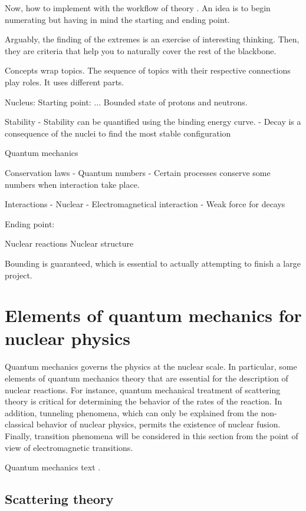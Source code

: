 \documentclass[openany]{book}
\begin{document}
	Now, how to implement with the workflow of theory 
	. An idea is to begin numerating but having in mind the starting and ending point. 
	
	Arguably, the finding of the extremes is an exercise of interesting thinking. Then, they are criteria that help you to naturally cover the rest of the blackbone. 
 
 
 Concepts wrap topics. The sequence of topics with their respective connections play roles. It uses different parts. 
 
 Nucleus:
 Starting point: ...
 	Bounded state of protons and neutrons. 
 	
 	Stability 
 		-	Stability can be quantified using the binding energy curve. 
 		-	Decay is a consequence of the nuclei to find the most stable configuration
 	
 	Quantum mechanics 
 	
  	Conservation laws
 		-	Quantum numbers
 		-	Certain processes conserve some numbers when interaction take place. 
 	
 	Interactions
 		-	Nuclear 
 		-	Electromagnetical interaction
 		-	Weak force for decays
 		
 Ending point: 
 	
 	Nuclear reactions
 	Nuclear structure 
 
 	
 
 
Bounding is guaranteed, which is essential to actually attempting to finish a large project. 
\section{Elements of quantum mechanics for nuclear physics} \label{sec:quantumMechanics}


Quantum mechanics governs the physics at the nuclear scale. In particular, some elements of quantum mechanics theory that are essential for the description of nuclear reactions. For instance, quantum mechanical treatment of scattering theory is critical for determining the behavior of the rates of the reaction. In addition, tunneling phenomena, which can only be explained from the non-classical behavior of nuclear physics, permits the existence of nuclear fusion. Finally, transition phenomena will be considered in this section from the point of view of electromagnetic transitions. 

Quantum mechanics text \cite{dick_2016}.

\subsection{Scattering theory} \label{sub:scatteringTheory}
\end{document}
